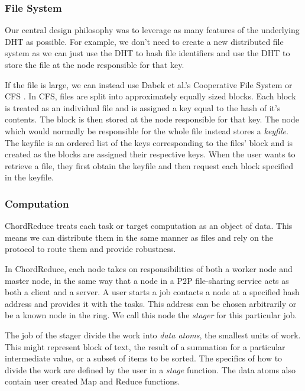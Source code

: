 \subsubsection{File System}
Our central design philosophy was to leverage as many features of the underlying DHT as possible.  
For example, we don't need to create a new distributed file system as we can just use the DHT to hash file identifiers and use the DHT to store the file at the node responsible for that key.

If the file is large, we can instead use Dabek et al.'s Cooperative File System or CFS \cite{CFS}.
In CFS, files are split into approximately equally sized blocks.  
Each block is treated as an individual file and is assigned a key equal to the hash of it's contents.  
The block is then stored at the node responsible for that key. 
The node which would normally be responsible for the whole file instead stores a \textit{keyfile}.  
The keyfile is an ordered list of the keys corresponding to the files' block and is created as the blocks are assigned their respective keys.  
When the user wants to retrieve a file, they first obtain the keyfile and then request each block specified in the keyfile.


\subsubsection{Computation}


ChordReduce treats each task or target computation as an object of data.
This means we can distribute them in the same manner as files and rely on the protocol to route them and provide robustness.


In ChordReduce, each node takes on responsibilities of both a worker node and master node, in the same way that a node in a P2P file-sharing service acts as both a client and a server.  
A user starts a job contacts a node at a specified hash address and provides it with the tasks.  
This address can be chosen arbitrarily or be a known node in the ring. 
We call this node the \textit{stager} for this particular job.  

The job of the stager divide the work into \emph{data atoms}, the smallest units of work. 
This might represent block of text, the result of a summation for a particular intermediate value, or a subset of items to be sorted. 
The specifics of how to divide the work are defined by the user in a \emph{stage} function.  
The data atoms also contain user created Map and Reduce functions.

